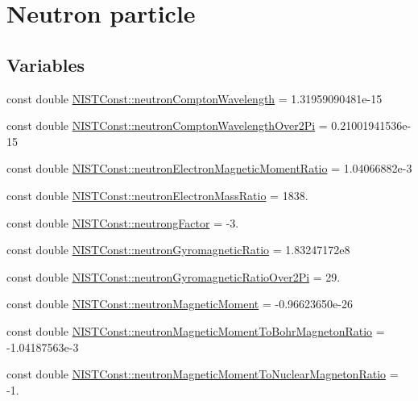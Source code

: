 \hypertarget{group___n_i_s_t_const-_neutron}{}\section{Neutron particle}
\label{group___n_i_s_t_const-_neutron}
\subsection*{Variables}
\begin{DoxyCompactItemize}
\item 
const double \hyperlink{group___n_i_s_t_const-_neutron_ga769ac3bb36b199f820b5d2974d63f897}{N\+I\+S\+T\+Const\+::neutron\+Compton\+Wavelength} = 1.\+31959090481e-\/15
\item 
const double \hyperlink{group___n_i_s_t_const-_neutron_ga296bbfcb4bd095c1167efa636898632c}{N\+I\+S\+T\+Const\+::neutron\+Compton\+Wavelength\+Over2\+Pi} = 0.\+21001941536e-\/15
\item 
const double \hyperlink{group___n_i_s_t_const-_neutron_ga3aab0a26b37b5116b3861164274b599b}{N\+I\+S\+T\+Const\+::neutron\+Electron\+Magnetic\+Moment\+Ratio} = 1.\+04066882e-\/3
\item 
const double \hyperlink{group___n_i_s_t_const-_neutron_gab348dce51150510468de9d4aa9dece17}{N\+I\+S\+T\+Const\+::neutron\+Electron\+Mass\+Ratio} = 1838.
\item 
const double \hyperlink{group___n_i_s_t_const-_neutron_gac96a82ff7cb2cf20cb9cfe754756c08e}{N\+I\+S\+T\+Const\+::neutrong\+Factor} = -\/3.
\item 
const double \hyperlink{group___n_i_s_t_const-_neutron_gaa36e892cf37340a9122574e4a957570d}{N\+I\+S\+T\+Const\+::neutron\+Gyromagnetic\+Ratio} = 1.\+83247172e8
\item 
const double \hyperlink{group___n_i_s_t_const-_neutron_ga66ce4219c0fa9d7e9050e5bef3cb743c}{N\+I\+S\+T\+Const\+::neutron\+Gyromagnetic\+Ratio\+Over2\+Pi} = 29.
\item 
const double \hyperlink{group___n_i_s_t_const-_neutron_ga42a101bcaf7105edbfd6c06de9633d22}{N\+I\+S\+T\+Const\+::neutron\+Magnetic\+Moment} = -\/0.\+96623650e-\/26
\item 
const double \hyperlink{group___n_i_s_t_const-_neutron_ga01b6142f2d5dd4cd6ff10d2938a312cf}{N\+I\+S\+T\+Const\+::neutron\+Magnetic\+Moment\+To\+Bohr\+Magneton\+Ratio} = -\/1.\+04187563e-\/3
\item 
const double \hyperlink{group___n_i_s_t_const-_neutron_ga6ee94c226124c9b64617ed473e78902a}{N\+I\+S\+T\+Const\+::neutron\+Magnetic\+Moment\+To\+Nuclear\+Magneton\+Ratio} = -\/1.

\end{DoxyCompactItemize}
